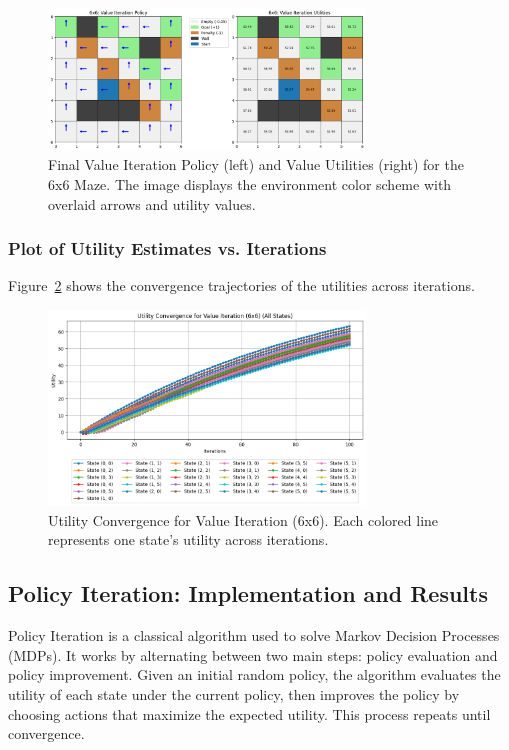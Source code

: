 \documentclass[11pt]{article}
\begin{document}
\begin{figure}[H]
    \centering
    \includegraphics[width=0.75\textwidth]{6x6_value_iteration.png}
    \caption{Final Value Iteration Policy (left) and Value Utilities (right) for the 6x6 Maze. The image displays the environment color scheme with overlaid arrows and utility values.}
    \label{fig:6x6_vi_side_by_side}
\end{figure}

\subsubsection{Plot of Utility Estimates vs. Iterations}
Figure~\ref{fig:6x6_vi_convergence} shows the convergence trajectories of the utilities across iterations.
\begin{figure}[H]
    \centering
    \includegraphics[width=0.75\textwidth]{6x6_value_iteration_convergence.png}
    \caption{Utility Convergence for Value Iteration (6x6). Each colored line represents one state's utility across iterations.}
    \label{fig:6x6_vi_convergence}
\end{figure}

\newpage
\subsection{Policy Iteration: Implementation and Results}
\label{sec:pi_6x6}
Policy Iteration is a classical algorithm used to solve Markov Decision Processes (MDPs). It works by alternating between two main steps: policy evaluation and policy improvement. Given an initial random policy, the algorithm evaluates the utility of each state under the current policy, then improves the policy by choosing actions that maximize the expected utility. This process repeats until convergence.
\end{document}
